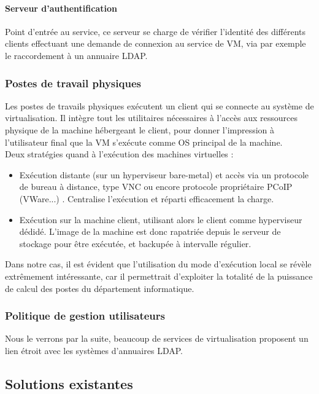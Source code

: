 \paragraph{Serveur d'authentification} 
Point d'entrée au service, ce serveur se charge de vérifier l'identité des différents clients effectuant une demande de connexion au service de VM, via par exemple le raccordement à un annuaire LDAP.

\subsubsection{Postes de travail physiques}

Les postes de travails physiques exécutent un client qui se connecte au système de virtualisation. Il intègre tout les utilitaires nécessaires à l'accès aux ressources physique de la machine hébergeant le client, pour donner l'impression à l'utilisateur final que la VM s'exécute comme OS principal de la machine.\\
Deux stratégies quand à l'exécution des machines virtuelles :\\
\begin{itemize}
\item Exécution distante (sur un hyperviseur bare-metal) et accès via un protocole de bureau à distance, type VNC ou encore protocole propriétaire PCoIP (VWare...) . Centralise l'exécution et réparti efficacement la charge.
\item Exécution sur la machine client, utilisant alors le client comme hyperviseur dédidé. L'image de la machine est donc rapatriée depuis le serveur de stockage pour être exécutée, et backupée à intervalle régulier.
\end{itemize}

Dans notre cas, il est évident que l'utilisation du mode d'exécution local se révèle extrêmement intéressante, car il permettrait d'exploiter la totalité de la puissance de calcul des postes du département informatique.

\subsubsection{Politique de gestion utilisateurs}

Nous le verrons par la suite, beaucoup de services de virtualisation proposent un lien étroit avec les systèmes d'annuaires LDAP.

\subsection{Solutions existantes}

